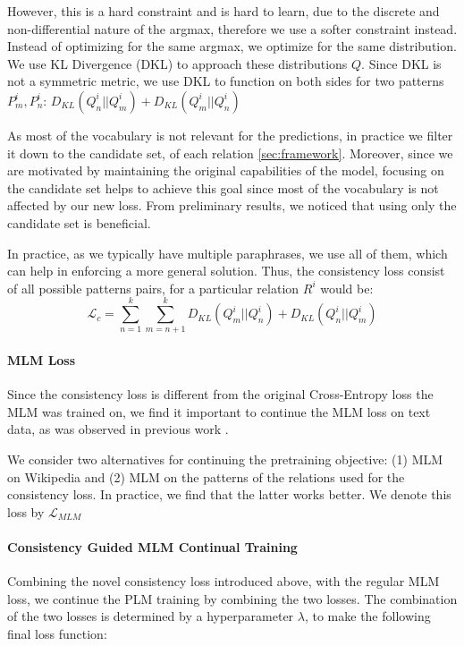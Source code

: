 However, this is a hard constraint and is hard to learn, due to the discrete and non-differential nature of the argmax, therefore we use a softer constraint instead.
Instead of optimizing for the same argmax, we optimize for the same distribution.
We use KL Divergence (DKL) to approach these distributions $Q$. Since DKL is not a symmetric metric, we use DKL to function on both sides for two patterns $P^i_m,P^i_n$:
$D_{KL}(Q^i_n||Q^i_m) + D_{KL} (Q^i_m||Q^i_n)$

As most of the vocabulary is not relevant for the
predictions, in practice we filter it down to the candidate set, of each relation \ref{sec:framework}. Moreover, since we are motivated by maintaining the original capabilities of the model, focusing on the candidate set helps to achieve this goal since most of the vocabulary is not affected by our new loss.
From preliminary results, we noticed that using only the candidate set is beneficial.

In practice, as we typically have multiple paraphrases, we use all of them, which can help in enforcing a more general solution. Thus, the consistency loss consist of all possible patterns pairs, for a particular relation $R^i$ would be:
\[
\mathcal{L}_{c} = \sum_{n=1}^k \sum_{m=n+1}^k D_{KL}(Q^i_m||Q^i_n) + D_{KL}(Q^i_n||Q^i_m)
\]


\paragraph{MLM Loss}
Since the consistency loss is different from the original Cross-Entropy loss the MLM was trained on, we find it important to continue the MLM loss on text data, as was observed in previous work \cite{geva2020injecting}.

We consider two alternatives for continuing the pretraining objective: (1) MLM on Wikipedia and (2) MLM on the patterns of the relations used for the consistency loss. In practice, we find that the latter works better. We denote this loss by $\mathcal{L}_{MLM}$


\paragraph{Consistency Guided MLM Continual Training}

Combining the novel consistency loss introduced above, with the regular MLM loss, we continue the PLM training by combining the two losses. The combination of the two losses is determined by a hyperparameter $\lambda$, to make the following final loss function:

